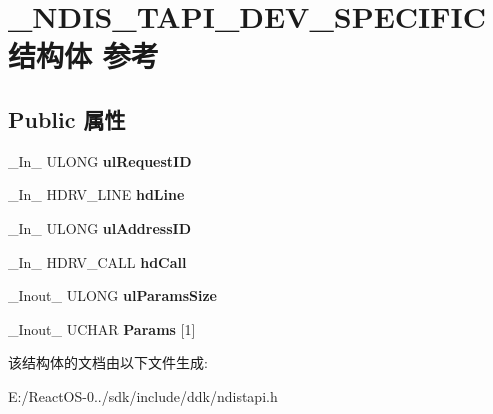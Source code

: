 \hypertarget{struct___n_d_i_s___t_a_p_i___d_e_v___s_p_e_c_i_f_i_c}{}\section{\+\_\+\+N\+D\+I\+S\+\_\+\+T\+A\+P\+I\+\_\+\+D\+E\+V\+\_\+\+S\+P\+E\+C\+I\+F\+I\+C结构体 参考}
\label{struct___n_d_i_s___t_a_p_i___d_e_v___s_p_e_c_i_f_i_c}
\subsection*{Public 属性}
\begin{DoxyCompactItemize}
\item 
\mbox{\label{struct___n_d_i_s___t_a_p_i___d_e_v___s_p_e_c_i_f_i_c_aca6a4324e387cb13a67e446c0c942343}} 
\+\_\+\+In\+\_\+ U\+L\+O\+NG {\bfseries ul\+Request\+ID}
\item 
\mbox{\label{struct___n_d_i_s___t_a_p_i___d_e_v___s_p_e_c_i_f_i_c_a97e04d2c0499504976234b56a5c1d876}} 
\+\_\+\+In\+\_\+ H\+D\+R\+V\+\_\+\+L\+I\+NE {\bfseries hd\+Line}
\item 
\mbox{\label{struct___n_d_i_s___t_a_p_i___d_e_v___s_p_e_c_i_f_i_c_a76c9ce657d53bcd3906f881eb78ca972}} 
\+\_\+\+In\+\_\+ U\+L\+O\+NG {\bfseries ul\+Address\+ID}
\item 
\mbox{\label{struct___n_d_i_s___t_a_p_i___d_e_v___s_p_e_c_i_f_i_c_a0651e8a9b1aa57aaad4c52e6ff37dd18}} 
\+\_\+\+In\+\_\+ H\+D\+R\+V\+\_\+\+C\+A\+LL {\bfseries hd\+Call}
\item 
\mbox{\label{struct___n_d_i_s___t_a_p_i___d_e_v___s_p_e_c_i_f_i_c_a119b5e01071d86421ed61f21a8e9d4df}} 
\+\_\+\+Inout\+\_\+ U\+L\+O\+NG {\bfseries ul\+Params\+Size}
\item 
\mbox{\label{struct___n_d_i_s___t_a_p_i___d_e_v___s_p_e_c_i_f_i_c_a63a1676cf70a2be742d3ab5f2ec3c587}} 
\+\_\+\+Inout\+\_\+ U\+C\+H\+AR {\bfseries Params} \mbox{[}1\mbox{]}
\end{DoxyCompactItemize}


该结构体的文档由以下文件生成\+:\begin{DoxyCompactItemize}
\item 
E\+:/\+React\+O\+S-\/0../sdk/include/ddk/ndistapi.\+h\end{DoxyCompactItemize}
